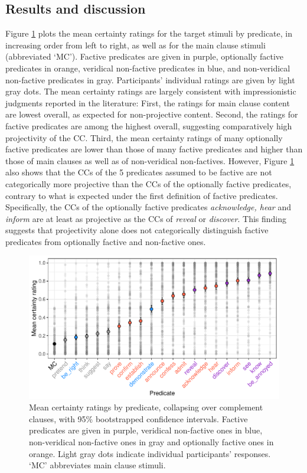 \documentclass[11pt,fleqn]{article}
\newcommand{\6}{\mbox{$[\hspace*{-.6mm}[$}}
\newcommand{\9}{\mbox{$]\hspace*{-.6mm}]$}}
\begin{document}
\subsection{Results and discussion}\label{s22}

Figure \ref{f-projectivity} plots the mean certainty ratings for the target stimuli by predicate, in increasing order from left to right, as well as for the main clause stimuli (abbreviated `MC'). Factive predicates are given in purple, optionally factive predicates in orange, veridical non-factive predicates in blue, and non-veridical non-factive predicates in gray. Participants' individual ratings are given by light gray dots.  The mean certainty ratings are largely consistent with impressionistic judgments reported in the literature: First, the ratings for main clause content are lowest overall, as expected for non-projective content. Second, the ratings for factive predicates are among the highest overall, suggesting comparatively high projectivity of the CC. Third, the mean certainty ratings of many optionally factive predicates are lower than those of many factive predicates and higher than those of main clauses as well as of non-veridical non-factives. However, Figure \ref{f-projectivity} also shows that the CCs of the 5 predicates assumed to be factive are not categorically more projective than the CCs of the optionally factive predicates, contrary to what is expected under the first definition of factive predicates. Specifically, the CCs of the optionally factive predicates {\em acknowledge, hear} and {\em inform} are at least as projective as the CCs of {\em reveal} or {\em discover}. This finding suggests that projectivity alone does not categorically distinguish factive predicates from optionally factive and non-factive ones.

\begin{figure}[H]
\centering

\includegraphics[width=.7\paperwidth]{../results/5-projectivity-no-fact/graphs/means-projectivity-by-predicate-variability}

\caption{Mean certainty ratings by predicate, collapsing over complement clauses, with 95\% bootstrapped confidence intervals. Factive predicates are given in purple, veridical non-factive ones in blue, non-veridical non-factive ones in gray and optionally factive ones in orange. Light gray dots indicate individual participants' responses. `MC' abbreviates main clause stimuli.}
\label{f-projectivity}
\end{figure}
\end{document}
